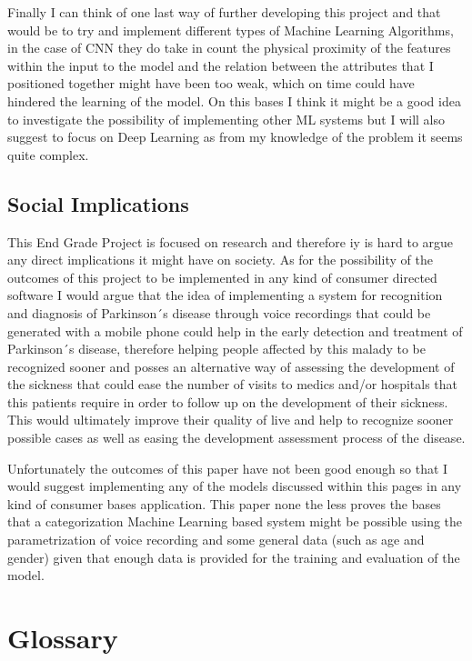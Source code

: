 \documentclass[12pt, a4paper]{article}
\begin{document}
	Finally I can think of one last way of further developing this project and that would be to try and implement different types of Machine Learning Algorithms, in the case of CNN they do take in count the physical proximity of the features within the input to the model and the relation between the attributes that I positioned together might have been too weak, which on time could have hindered the learning of the model. On this bases I think it might be a good idea to investigate the possibility of implementing other ML systems but I will also suggest to focus on Deep Learning as from my knowledge of the problem it seems quite complex.
	
	\clearpage
	
	\subsection{Social Implications}
	
	This End Grade Project is focused on research and therefore iy is hard to argue any direct implications it might have on society. As for the possibility of the outcomes of this project to be implemented in any kind of consumer directed software I would argue that the idea of implementing a system for recognition and diagnosis of Parkinson´s disease through voice recordings that could be generated with a mobile phone could help in the early detection and treatment of Parkinson´s disease, therefore helping people affected by this malady to be recognized sooner and posses an alternative way of assessing the development of the sickness that could ease the number of visits to medics and/or hospitals that this patients require in order to follow up on the development of their sickness. This would ultimately improve their quality of live and help to recognize sooner possible cases as well as easing the development assessment process of the disease.
	
	Unfortunately the outcomes of this paper have not been good enough so that I would suggest implementing any of the models discussed within this pages in any kind of consumer bases application. This paper none the less proves the bases that a categorization Machine Learning based system might be possible using the parametrization of voice recording and some general data (such as age and gender) given that enough data is provided for the training and evaluation of the model.
	
	\clearpage
	
	\section*{Glossary}
	
\end{document}
